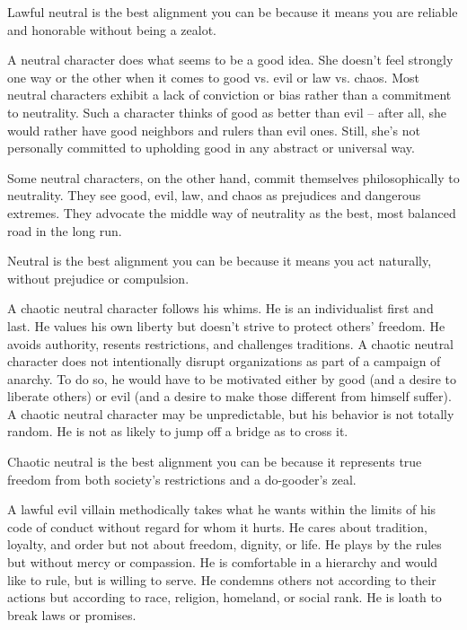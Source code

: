 Lawful neutral is the best alignment you can be because it means you are reliable and honorable without being a zealot.

 A neutral character does what seems to be a good idea. She doesn't feel strongly one way or the other when it comes to good vs. evil or law vs. chaos. Most neutral characters exhibit a lack of conviction or bias rather than a commitment to neutrality. Such a character thinks of good as better than evil -- after all, she would rather have good neighbors and rulers than evil ones. Still, she's not personally committed to upholding good in any abstract or universal way.

Some neutral characters, on the other hand, commit themselves philosophically to neutrality. They see good, evil, law, and chaos as prejudices and dangerous extremes. They advocate the middle way of neutrality as the best, most balanced road in the long run.

Neutral is the best alignment you can be because it means you act naturally, without prejudice or compulsion.

 A chaotic neutral character follows his whims. He is an individualist first and last. He values his own liberty but doesn't strive to protect others' freedom. He avoids authority, resents restrictions, and challenges traditions. A chaotic neutral character does not intentionally disrupt organizations as part of a campaign of anarchy. To do so, he would have to be motivated either by good (and a desire to liberate others) or evil (and a desire to make those different from himself suffer). A chaotic neutral character may be unpredictable, but his behavior is not totally random. He is not as likely to jump off a bridge as to cross it.

Chaotic neutral is the best alignment you can be because it represents true freedom from both society's restrictions and a do-gooder's zeal.

 A lawful evil villain methodically takes what he wants within the limits of his code of conduct without regard for whom it hurts. He cares about tradition, loyalty, and order but not about freedom, dignity, or life. He plays by the rules but without mercy or compassion. He is comfortable in a hierarchy and would like to rule, but is willing to serve. He condemns others not according to their actions but according to race, religion, homeland, or social rank. He is loath to break laws or promises.

